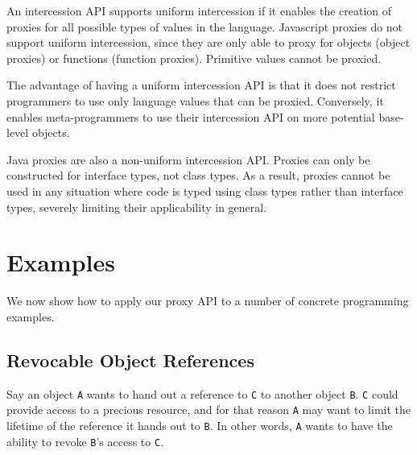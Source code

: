 \documentclass{acm_proc_article-sp}
\begin{document}
An intercession API supports uniform intercession if it enables the creation of proxies for all possible types of values in the language. Javascript proxies do not support uniform intercession, since they are only able to proxy for objects (object proxies) or functions (function proxies). Primitive values cannot be proxied.

The advantage of having a uniform intercession API is that it does not restrict programmers to use only language values that can be proxied. Conversely, it enables meta-programmers to use their intercession API on more potential base-level objects.

Java proxies are also a non-uniform intercession API. Proxies can only be constructed for interface types, not class types. As a result, proxies cannot be used in any situation where code is typed using class types rather than interface types, severely limiting their applicability in general.


\section{Examples}
\label{sec:examples}

We now show how to apply our proxy API to a number of concrete programming examples.

\subsection{Revocable Object References}
\label{sub:revoker}

Say an object \texttt{A} wants to hand out a reference to \texttt{C} to another object \texttt{B}. \texttt{C} could provide access to a precious resource, and for that reason \texttt{A} may want to limit the lifetime of the reference it hands out to \texttt{B}. In other words, \texttt{A} wants to have the ability to revoke \texttt{B}'s access to \texttt{C}.
\end{document}
